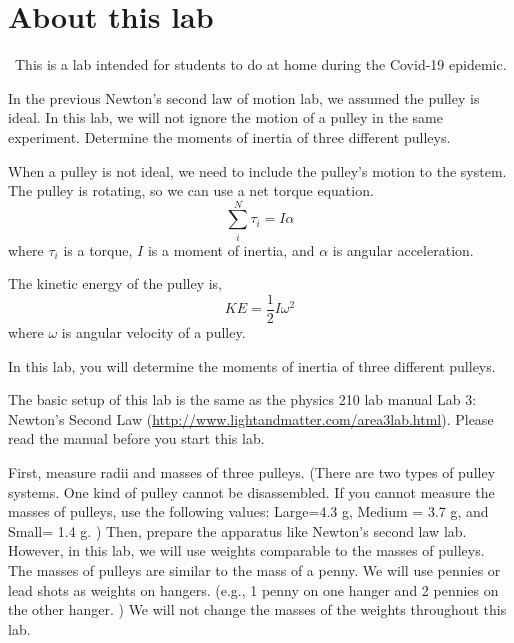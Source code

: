 \renewcommand\thechapter{c1.13b}
\label{lab:covid-pulley}

\section*{About this lab}

\covid\ 
This is a lab intended for students to do at home during the Covid-19 epidemic. 

\apparatus
{}

\begin{goals}

\item[] In the previous Newton's second law of motion lab, we assumed the pulley is ideal. In this lab, we will not ignore the motion of a pulley in the same experiment. Determine the moments of inertia of three different pulleys.  
\end{goals}

\introduction

When a pulley is not ideal, we need to include the pulley's motion to the system. The pulley is rotating, so we can use a net torque equation. 
\begin{equation*}
\sum^N_i \tau_i = I \alpha
\end{equation*}
where $\tau_i$ is a torque, $I$ is a moment of inertia, and $\alpha$ is angular acceleration. 

The kinetic energy of the pulley is,
\begin{equation*}
KE = \dfrac{1}{2} I \omega^2
\end{equation*}
where $\omega$ is angular velocity of a pulley. 

In this lab, you will determine the moments of inertia of three different pulleys. 

\observations 
The basic setup of this lab is the same as the physics 210 lab manual Lab 3: Newton's Second Law (\url{http://www.lightandmatter.com/area3lab.html}). Please read the manual before you start this lab. 

First, measure radii and masses of three pulleys. (There are two types of pulley systems. One kind of pulley cannot be disassembled. If you cannot measure the masses of pulleys, use the following values: Large=4.3 g, Medium = 3.7 g, and Small= 1.4 g. )  Then, prepare the apparatus like Newton's second law lab. However, in this lab, we will use weights comparable to the masses of pulleys. The masses of pulleys are similar to the mass of a penny. We will use pennies or lead shots as weights on hangers.  (e.g., 1 penny on one hanger and 2 pennies on the other hanger. ) We will not change the masses of the weights throughout this lab. 

